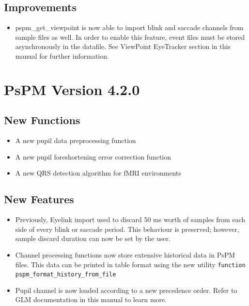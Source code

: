 \documentclass[english]{article}
\numberwithin{equation}{section}
\numberwithin{figure}{section}
\begin{document}
\subsection*{Improvements}
\begin{itemize}
\item pspm\_get\_viewpoint is now able to import blink and saccade channels
from sample files as well. In order to enable this feature, event
files must be stored asynchronously in the datafile. See ViewPoint
EyeTracker section in this manual for further information.
\end{itemize}

\section{PsPM Version 4.2.0}

\subsection*{New Functions}
\begin{itemize}
\item A new pupil data preprocessing function
\item A new pupil foreshortening error correction function
\item A new QRS detection algorithm for fMRI environments
\end{itemize}

\subsection*{New Features}
\begin{itemize}
\item Previously, Eyelink import used to discard 50 ms worth of samples
from each side of every blink or saccade period. This behaviour is
preserved; however, sample discard duration can now be set by the
user.
\item Channel processing functions now store extensive historical data in
PsPM files. This data can be printed in table format using the new
utility \texttt{function pspm\_format\_history\_from\_file}
\item Pupil channel is now loaded according to a new precedence order. Refer
to GLM documentation in this manual to learn more.
\end{itemize}
\end{document}
